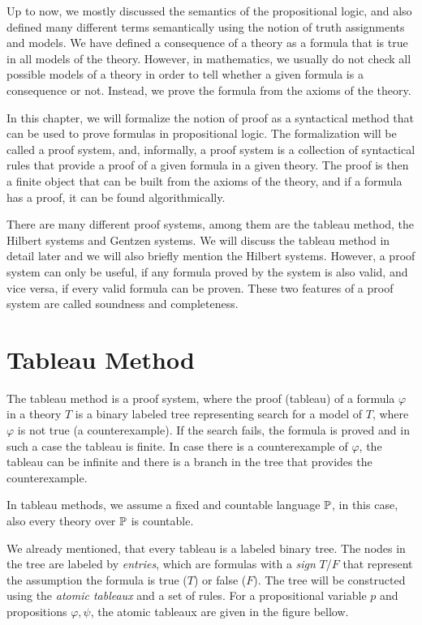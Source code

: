 Up to now, we mostly discussed the semantics of the propositional logic, and also defined many different terms semantically using the notion of truth assignments and models. We have defined a consequence of a theory as a formula that is true in all models of the theory. However, in mathematics, we usually do not check all possible models of a theory in order to tell whether a given formula is a consequence or not. Instead, we prove the formula from the axioms of the theory. 

In this chapter, we will formalize the notion of proof as a syntactical method that can be used to prove formulas in propositional logic. The formalization will be called a proof system, and, informally, a proof system is a collection of syntactical rules that provide a proof of a given formula in a given theory. The proof is then a finite object that can be built from the axioms of the theory, and if a formula has a proof, it can be found algorithmically. 

There are many different proof systems, among them are the tableau method, the Hilbert systems and Gentzen systems. We will discuss the tableau method in detail later and we will also briefly mention the Hilbert systems. However, a proof system can only be useful, if any formula proved by the system is also valid, and vice versa, if every valid formula can be proven. These two features of a proof system are called soundness and completeness. 

\section{Tableau Method}

The tableau method is a proof system, where the proof (tableau) of a formula $\varphi$ in a theory $T$ is a binary labeled tree representing search for a model of $T$, where $\varphi$ is not true (a counterexample). If the search fails, the formula is proved and in such a case the tableau is finite. In case there is a counterexample of $\varphi$, the tableau can be infinite and there is a branch in the tree that provides the counterexample.

In tableau methods, we assume a fixed and countable language $\mathbb{P}$, in this case, also every theory over $\mathbb{P}$ is countable.

We already mentioned, that every tableau is a labeled binary tree. The nodes in the tree are labeled by \emph{entries}, which are formulas with a \emph{sign} $T$/$F$ that represent the assumption the formula is true ($T$) or false ($F$). The tree will be constructed using the \emph{atomic tableaux} and a set of rules. For a propositional variable $p$ and propositions $\varphi, \psi$, the atomic tableaux are given in the figure bellow.

